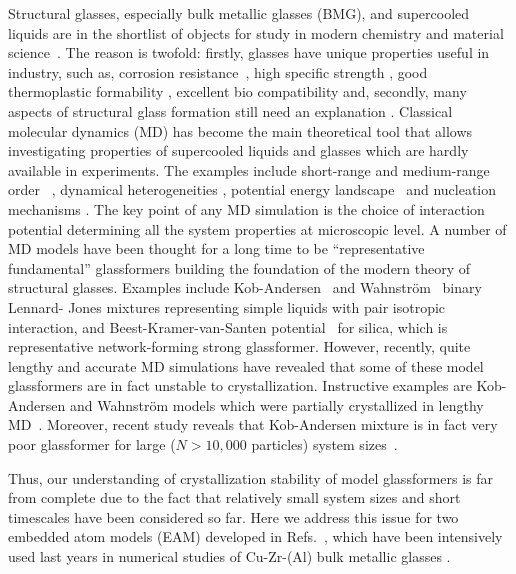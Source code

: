 \documentclass[jcp,twocolumn,superscriptaddress,floatfix,graphicx,showpacs]{revtex4-1}
\begin{document}
Structural glasses, especially bulk metallic glasses (BMG), and supercooled liquids are in the shortlist of objects for study in modern chemistry and material science~\cite{Suryanarayana2017BMG_Book,Royall2015PhysRep,Xu2017JCP,Ediger2017JCP,Li2017JCP,Hu2017JCP,Wisitsorasak2017PNAS,Ninarello2017PRX,Ward2018ActaMater}. The reason is twofold: firstly, glasses have unique properties useful in industry, such as, corrosion
resistance~\cite{Frankel2018MaterDegr,Sagasti2018AIPAdv}, high specific strength \cite{Suryanarayana2017BMG_Book}, good thermoplastic formability \cite{Gong2018Intermet}, excellent bio compatibility \cite{Liens2018Materials} and, secondly, many aspects of structural glass formation still need an explanation \cite{Suryanarayana2017BMG_Book,Royall2015PhysRep,Cheng2011ProgMateSci}. Classical molecular dynamics (MD) has become the main theoretical tool that allows investigating properties of supercooled liquids and glasses which are hardly available in experiments. The examples include short-range and medium-range order ~\cite{Royall2015PhysRep,Cheng2011ProgMateSci,Pasturel2017JCP,Ghaemi2018JNCS}, dynamical heterogeneities \cite{Berthier2011RevModPhys,Usui2018JCP,Caballero2018JCP,Royall2017JStatMech}, potential energy landscape~\cite{Debenedetti2001Nature,Cavagna2009PhysRep,Handle2018JCP,Sun2017JCP} and nucleation mechanisms \cite{Shibuta2017NatureComm,Mokshin2017PCCP}.
The key point of any MD simulation is the choice of interaction potential determining all the system properties at microscopic level. A number of MD models have been thought for a long time to be ``representative fundamental'' glassformers building the foundation of the modern theory of structural glasses. Examples include Kob-Andersen~\cite{Kob1994PRL} and Wahnstr\"om~\cite{Wahnstrom1991PRA} binary Lennard- Jones mixtures representing simple liquids with pair isotropic interaction, and Beest-Kramer-van-Santen potential~\cite{Beest1955PRL} for silica, which is representative network-forming strong glassformer. However, recently, quite lengthy and accurate MD simulations have revealed  that some of these model glassformers are in fact unstable to crystallization. Instructive examples are Kob-Andersen and Wahnstr\"om models which were partially crystallized in lengthy MD~\cite{Toxvaerd2009JCP,Ingebrigtsen2018crystallisation}. Moreover, recent study reveals that Kob-Andersen mixture is in fact very poor glassformer for large ($N>10,000$ particles) system sizes~\cite{Ingebrigtsen2018crystallisation}.

Thus, our understanding of crystallization stability of model glassformers is far from complete due to the fact that relatively small system sizes and short timescales have been considered so far. Here we address this issue for two embedded atom models (EAM) developed in Refs.~\cite{Mendelev2009PhilMag,Cheng2009PRL}, which have been intensively used last years in numerical studies of Cu-Zr-(Al) bulk metallic glasses \cite{Li2009PRB,Cheng2009PRL,Peng2010ApplPhysLett,Soklaski2013PRB,Wu2013PRB,Wen2013JNonCrystSol,Wang2015JPhysChemA,Zhang2012JAlloysComp1,Ryltsev2016JCP,Klumov2016JETPLett,Khusnutdinoff2016JETP,Lad2017JCP}.
\end{document}
